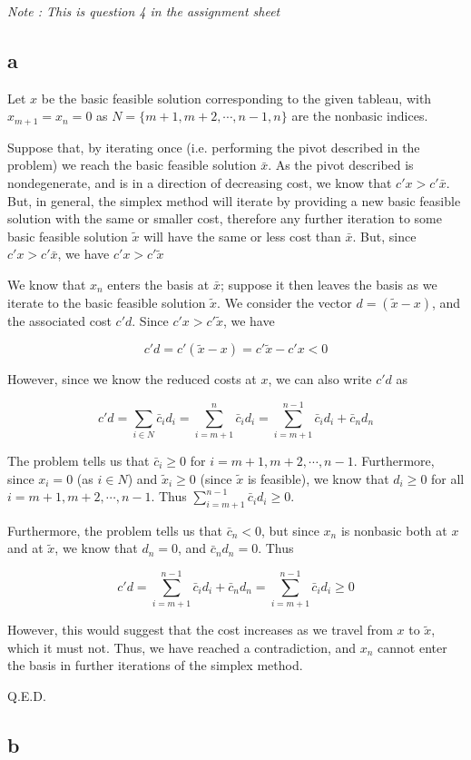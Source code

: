 \textit{Note : This is question 4 in the assignment sheet}
\subsection*{a}
Let $x$ be the basic feasible solution corresponding to the given tableau, with $x_{m+1}=x_n=0$ as $N=\{m+1, m+2, \cdots , n-1, n\}$ are the nonbasic indices. 

Suppose that, by iterating once (i.e. performing the pivot described in the problem) we reach the basic feasible solution $\bar{x}$. As the pivot described is nondegenerate, and is in a direction of decreasing cost, we know that $c'x>c'\bar{x}$. But, in general, the simplex method will iterate by providing a new basic feasible solution with the same or smaller cost, therefore any further iteration to some basic feasible solution $\tilde{x}$ will have the same or less cost than $\bar{x}$. But, since $c'x>c'\bar{x}$, we have $c'x>c'\tilde{x}$

We know that $x_n$ enters the basis at $\bar{x}$; suppose it then leaves the basis as we iterate to the basic feasible solution $\tilde{x}$. We consider the vector $d=(\tilde{x}-x)$, and the associated cost $c'd$. Since $c'x>c'\tilde{x}$, we have

$$
c'd=c'(\tilde{x}-x)=c'\tilde{x}-c'x<0
$$

However, since we know the reduced costs at $x$, we can also write $c'd$ as

$$
c'd=\sum_{i\in N}\bar{c}_id_i=\sum_{i=m+1}^n\bar{c}_id_i=\sum_{i=m+1}^{n-1}\bar{c}_id_i+\bar{c}_nd_n
$$

The problem tells us that $\bar{c}_i\geq 0$ for $i=m+1, m+2, \cdots, n-1$. Furthermore, since $x_i=0$ (as $i\in N$) and $\tilde{x}_i\geq 0$ (since $\tilde{x}$ is feasible), we know that $d_i\geq 0$ for all $i=m+1, m+2, \cdots, n-1$. Thus $\sum_{i=m+1}^{n-1}\bar{c}_id_i\geq 0$.

Furthermore, the problem tells us that $\bar{c}_n<0$, but since $x_n$ is nonbasic both at $x$ and at $\tilde{x}$, we know that $d_n=0$, and $\bar{c}_nd_n=0$. Thus

$$
c'd=\sum_{i=m+1}^{n-1}\bar{c}_id_i+\bar{c}_nd_n=\sum_{i=m+1}^{n-1}\bar{c}_id_i \geq 0
$$

However, this would suggest that the cost increases as we travel from $x$ to $\tilde{x}$, which it must not. Thus, we have reached a contradiction, and $x_n$ cannot enter the basis in further iterations of the simplex method.

Q.E.D.

\subsection*{b}



